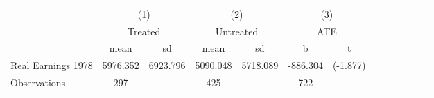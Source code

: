 {
\def\sym#1{\ifmmode^{#1}\else\(^{#1}\)\fi}
\begin{tabular}{l*{3}{cccc}}
\hline\hline
                    &\multicolumn{2}{c}{(1)}  &\multicolumn{2}{c}{(2)}  &\multicolumn{2}{c}{(3)}           \\
                    &\multicolumn{2}{c}{Treated}&\multicolumn{2}{c}{Untreated}&\multicolumn{2}{c}{ATE}           \\
                    &        mean&          sd&        mean&          sd&           b         &           t\\
\hline
Real Earnings 1978  &    5976.352&    6923.796&    5090.048&    5718.089&    -886.304         &    (-1.877)\\
\hline
Observations        &         297&            &         425&            &         722         &            \\
\hline\hline
\end{tabular}
}
